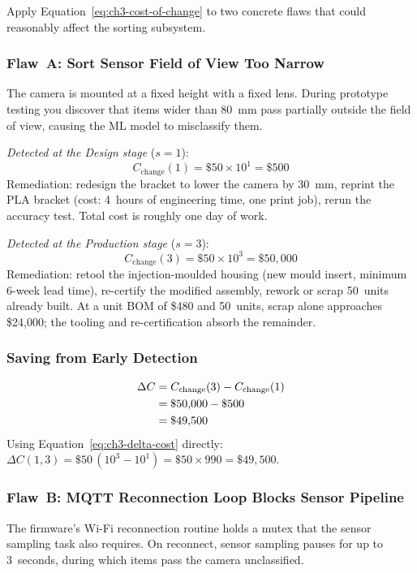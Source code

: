 Apply Equation~\eqref{eq:ch3-cost-of-change} to two concrete flaws that could
reasonably affect the sorting subsystem.

\subsubsection{Flaw~A: Sort Sensor Field of View Too Narrow}
The camera is mounted at a fixed height with a fixed lens.
During prototype testing you discover that items wider than 80~mm pass
partially outside the field of view, causing the ML model to misclassify them.

\medskip
\noindent\textit{Detected at the Design stage} ($s = 1$):
\begin{equation}
  C_{\text{change}}(1) = \$50 \times 10^1 = \$500
  \label{eq:ch3-flaw-a-design}
\end{equation}
Remediation: redesign the bracket to lower the camera by 30~mm, reprint the
PLA bracket (cost: 4~hours of engineering time, one print job), rerun the
accuracy test.
Total cost is roughly one day of work.

\medskip
\noindent\textit{Detected at the Production stage} ($s = 3$):
\begin{equation}
  C_{\text{change}}(3) = \$50 \times 10^3 = \$50{,}000
  \label{eq:ch3-flaw-a-production}
\end{equation}
Remediation: retool the injection-moulded housing (new mould insert,
minimum 6-week lead time), re-certify the modified assembly, rework or scrap
50~units already built.
At a unit BOM of \$480 and 50~units, scrap alone approaches \$24{,}000;
the tooling and re-certification absorb the remainder.

\subsubsection{Saving from Early Detection}
\begin{align}
  \Delta C &= C_{\text{change}}(3) - C_{\text{change}}(1) \notag \\
           &= \$50{,}000 - \$500 \notag \\
           &= \$49{,}500
  \label{eq:ch3-saving-flaw-a}
\end{align}
Using Equation~\ref{eq:ch3-delta-cost} directly:
$\Delta C(1,3) = \$50\,(10^3 - 10^1) = \$50 \times 990 = \$49{,}500$.

\subsubsection{Flaw~B: MQTT Reconnection Loop Blocks Sensor Pipeline}
The firmware's Wi-Fi reconnection routine holds a mutex that the sensor
sampling task also requires.
On reconnect, sensor sampling pauses for up to 3~seconds, during which items
pass the camera unclassified.


